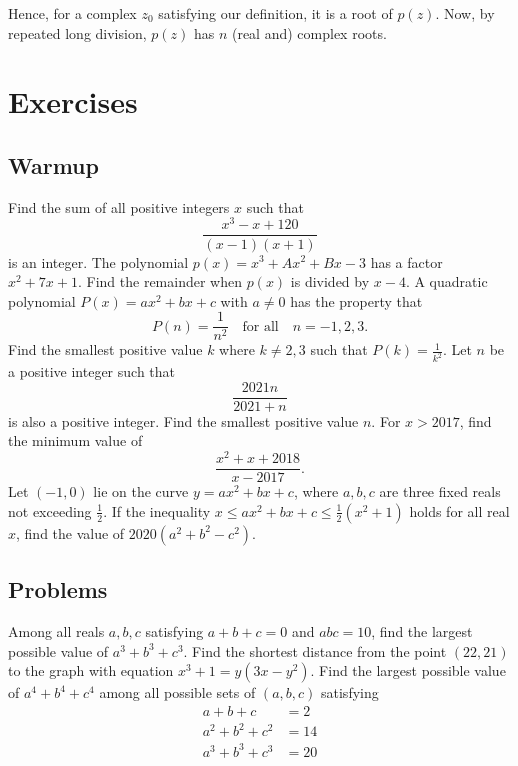 \documentclass[../jarvis.tex]{subfiles}
\begin{document}
Hence, for a complex $z_0$ satisfying our definition, it is a root of $p(z)$. Now, by repeated long division, $p(z)$ has $n$ (real and) complex roots.

\section{Exercises}
\subsection{Warmup}
\problem[2012 SMO(S) P12]Find the sum of all positive integers $x$ such that $$\frac{x^3-x+120}{(x-1)(x+1)}$$ is an integer.
\problem[2018 SMO(S) P8]The polynomial $p(x)=x^3+Ax^2+Bx-3$ has a factor $x^2+7x+1$. Find the remainder when $p(x)$ is divided by $x-4$.
\problem[2021 SMO(S) P9]A quadratic polynomial $P(x)=ax^2+bx+c$ with $a\neq 0$ has the property that
$$P(n)=\frac{1}{n^2} \quad\text{for all}\quad n=-1,2,3.$$
Find the smallest positive value $k$ where $k\neq 2,3$ such that $P(k)=\frac{1}{k^2}$.
\problem[2021 SMO(S) P24]Let $n$ be a positive integer such that
$$\frac{2021n}{2021+n}$$ is also a positive integer. Find the smallest positive value $n$.
\problem[2018 SMO(O) P8]For $x>2017$, find the minimum value of $$\frac{x^2+x+2018}{x-2017}.$$
\problem[2019 SMO(O) P5]Let $(-1,0)$ lie on the curve $y=ax^2+bx+c$, where $a,b,c$ are three fixed reals not exceeding $\frac{1}{2}$. If the inequality $x\leq ax^2+bx+c\leq \frac{1}{2}(x^2+1)$ holds for all real $x$, find the value of $2020(a^2+b^2-c^2)$.
\subsection{Problems}
\problem[2019 SMO(O) P8]Among all reals $a,b,c$ satisfying $a+b+c=0$ and $abc=10$, find the largest possible value of $a^3+b^3+c^3$.
\problem[2018 SMO(O) P11]Find the shortest distance from the point $(22,21)$ to the graph with equation $x^3+1=y(3x-y^2)$.
\problem[2021 SMO(O) P9]Find the largest possible value of $a^4+b^4+c^4$ among all possible sets of $(a,b,c)$ satisfying
\begin{align*}
    a+b+c&=2\\
    a^2+b^2+c^2&=14\\
    a^3+b^3+c^3&=20
\end{align*}
\end{document}
